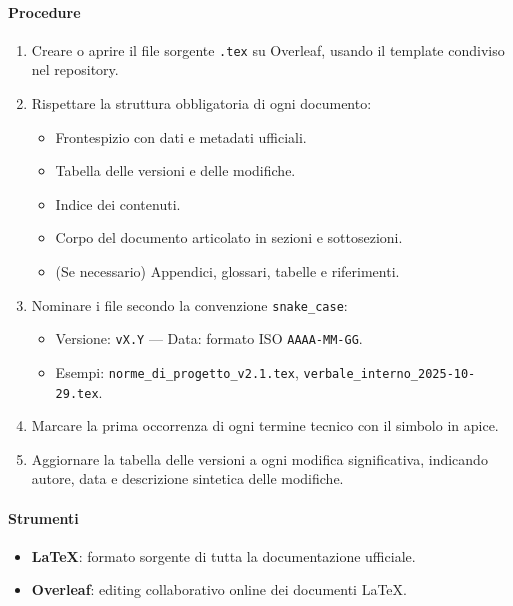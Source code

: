 \documentclass[a4paper, 11pt, oneside]{scrartcl}
\begin{document}
\paragraph{Procedure}
\begin{enumerate}
    \item Creare o aprire il file sorgente \texttt{.tex} su Overleaf{\scriptsize{}}, usando il template condiviso nel repository.
    \item Rispettare la struttura obbligatoria di ogni documento:
    \begin{itemize}
        \item Frontespizio{\scriptsize{}} con dati e metadati ufficiali.
        \item Tabella delle versioni e delle modifiche.
        \item Indice dei contenuti.
        \item Corpo del documento articolato in sezioni e sottosezioni.
        \item (Se necessario) Appendici, glossari, tabelle e riferimenti.
    \end{itemize}
    \item Nominare i file secondo la convenzione \texttt{snake\_case}{\scriptsize{}}:
    \begin{itemize}
        \item Versione: \texttt{vX.Y} — Data: formato ISO \texttt{AAAA-MM-GG}.
        \item Esempi: \texttt{norme\_di\_progetto\_v2.1.tex}, \texttt{verbale\_interno\_2025-10-29.tex}.
    \end{itemize}
    \item Marcare la prima occorrenza di ogni termine tecnico con il simbolo {\scriptsize{}} in apice.
    \item Aggiornare la tabella delle versioni a ogni modifica significativa, indicando autore, data e descrizione sintetica delle modifiche.
\end{enumerate}

\paragraph{Strumenti}
\begin{itemize}
    \item \textbf{\LaTeX{}}: formato sorgente di tutta la documentazione ufficiale.
    \item \textbf{Overleaf}: editing collaborativo online dei documenti \LaTeX{}.
\end{itemize}
\end{document}
